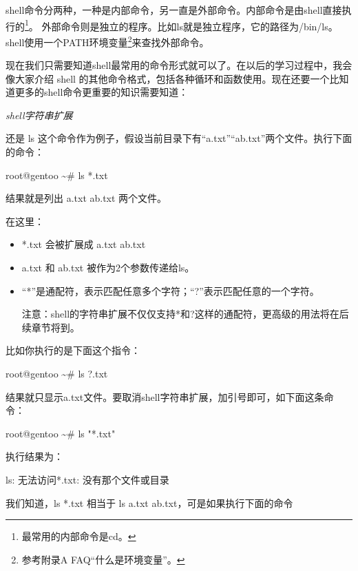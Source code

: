 shell命令分两种，一种是内部命令，另一直是外部命令。内部命令是由shell直接执行的\footnote{最常用的内部命令是cd。}。
外部命令则是独立的程序。比如ls就是独立程序，它的路径为/bin/ls。shell使用一个PATH环境变量\footnote{参考附录A FAQ“什么是环境变量”。}来查找外部命令。

现在我们只需要知道shell最常用的命令形式就可以了。在以后的学习过程中，我会像大家介绍 shell 的其他命令格式，包括各种循环和函数使用。现在还要一个比知道更多的shell命令更重要的知识需要知道：
\begin{center}\em
shell字符串扩展
\end{center}

还是 ls 这个命令作为例子，假设当前目录下有“a.txt”“ab.txt”两个文件。执行下面的命令：

\begin{code}
root@gentoo \textasciitilde \# ls *.txt
\end{code}

结果就是列出 a.txt ab.txt 两个文件。

在这里：
\begin{itemize}
\item *.txt 会被扩展成 a.txt ab.txt
\item a.txt 和 ab.txt 被作为2个参数传递给ls。
\item “*”是通配符，表示匹配任意多个字符；“?”表示匹配任意的一个字符。

\begin{insertnote}
注意：shell的字符串扩展不仅仅支持*和?这样的通配符，更高级的用法将在后续章节将到。
\end{insertnote}


\end{itemize}


比如你执行的是下面这个指令：

\begin{code}
root@gentoo \textasciitilde \# ls ?.txt
\end{code}

结果就只显示a.txt文件。要取消shell字符串扩展，加引号即可，如下面这条命令：

\begin{code}
root@gentoo \textasciitilde \# ls "*.txt"
\end{code}

执行结果为：

\begin{code}
ls: 无法访问*.txt: 没有那个文件或目录
\end{code}


我们知道，ls *.txt 相当于 ls a.txt ab.txt，可是如果执行下面的命令

